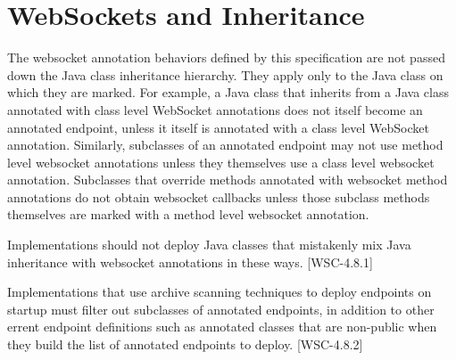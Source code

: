 \section{WebSockets and Inheritance}

The websocket annotation behaviors defined by this specification are not passed down the Java class inheritance hierarchy. They apply only to the Java class on which they are marked. For example, a Java class that inherits from a Java class annotated with class level WebSocket annotations does not itself become an annotated endpoint, unless it itself is annotated with a class level WebSocket annotation. Similarly, subclasses of an annotated endpoint may not use method level websocket annotations unless they themselves use a class level websocket annotation. Subclasses that override methods annotated with websocket method annotations do not obtain websocket callbacks unless those subclass methods themselves are marked with a method level websocket annotation.

Implementations should not deploy Java classes that mistakenly mix Java inheritance with websocket annotations in these ways.  [WSC-4.8.1]

Implementations that use archive scanning techniques to deploy endpoints on startup must filter out subclasses of annotated endpoints, in addition to other errent endpoint definitions such as annotated classes that are non-public when they build the list of annotated endpoints to deploy. [WSC-4.8.2]